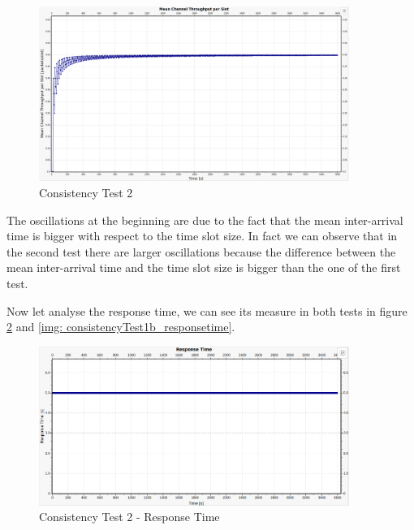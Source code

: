 \begin{figure}[H]
	\centering
	\includegraphics[width=0.9\textwidth]{img/consistencyTest1bWithAxis.png}
	\caption{Consistency Test 2}
	\label {img: consistencyTest1b}
\end{figure}

\noindent The oscillations at the beginning are due to the fact that the mean inter-arrival time is bigger with respect to the time slot size. In fact we can observe that in the second test there are larger oscillations because the difference between the mean inter-arrival time and the time slot size is bigger than the one of the first test.

\noindent Now let analyse the response time, we can see its measure in both tests in figure \ref{img: consistencyTest1a_responsetime} and \ref{img: consistencyTest1b_responsetime}.

\begin{figure}[H]
	\centering
	\includegraphics[width=0.9\textwidth]{img/consistencytest1a_responsetime.png}
	\caption{Consistency Test 2 - Response Time}
	\label {img: consistencyTest1a_responsetime}
\end{figure}

